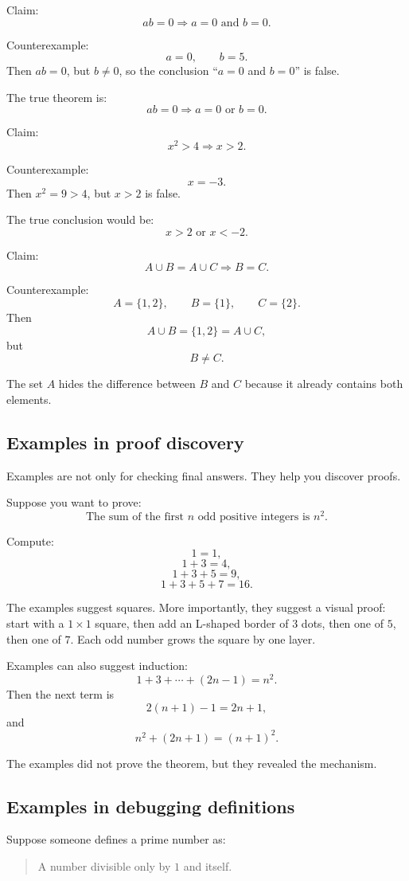 Claim:
\[
ab=0\Rightarrow a=0\text{ and }b=0.
\]

Counterexample:
\[
a=0,\qquad b=5.
\]
Then $ab=0$, but $b\neq0$, so the conclusion ``$a=0$ and $b=0$'' is false.

The true theorem is:
\[
ab=0\Rightarrow a=0\text{ or }b=0.
\]

Claim:
\[
x^2>4\Rightarrow x>2.
\]

Counterexample:
\[
x=-3.
\]
Then $x^2=9>4$, but $x>2$ is false.

The true conclusion would be:
\[
x>2\text{ or }x<-2.
\]

Claim:
\[
A\cup B=A\cup C\Rightarrow B=C.
\]

Counterexample:
\[
A=\{1,2\},\qquad B=\{1\},\qquad C=\{2\}.
\]
Then
\[
A\cup B=\{1,2\}=A\cup C,
\]
but
\[
B\neq C.
\]

The set $A$ hides the difference between $B$ and $C$ because it already contains both elements.

\subsection{Examples in proof discovery}

Examples are not only for checking final answers. They help you discover proofs.

Suppose you want to prove:
\[
\text{The sum of the first }n\text{ odd positive integers is }n^2.
\]

Compute:
\[
1=1,
\]
\[
1+3=4,
\]
\[
1+3+5=9,
\]
\[
1+3+5+7=16.
\]

The examples suggest squares. More importantly, they suggest a visual proof: start with a $1\times1$ square, then add an L-shaped border of $3$ dots, then one of $5$, then one of $7$. Each odd number grows the square by one layer.

Examples can also suggest induction:
\[
1+3+\cdots+(2n-1)=n^2.
\]
Then the next term is
\[
2(n+1)-1=2n+1,
\]
and
\[
n^2+(2n+1)=(n+1)^2.
\]

The examples did not prove the theorem, but they revealed the mechanism.

\subsection{Examples in debugging definitions}

Suppose someone defines a prime number as:

\begin{quote}
A number divisible only by $1$ and itself.
\end{quote}

